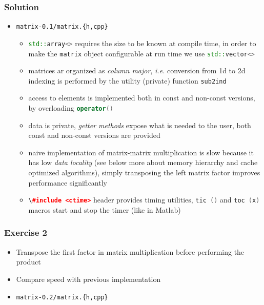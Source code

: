 \documentclass[smaller,a4paper,allowframebreaks]{beamer}
\begin{document}
\begin{frame}[allowframebreaks]\frametitle{Solution}
\begin{itemize}
\item {\tt matrix-0.1/matrix.\{h,cpp\}}\\[3mm]
\begin{itemize}
\item \lstinline[language=C++]{std::array<>}
      requires the size to be known at compile time,
      in order to make the \lstinline[language=C++]{matrix}
      object configurable at run time we use 
      \lstinline[language=C++]{std::vector<>}\\[3mm]
\item matrices ar organized as \emph{column major}, {\it i.e.}
      conversion from 1d to 2d indexing is performed by the utility
      (private) function \lstinline[language=C++]{sub2ind}\\[3mm]
\item access to elements is implemented both in const and non-const
      versions, by overloading \lstinline[language=C++]{operator()} \\[3mm]
\item data is private, \emph{getter methods} expose what is needed to 
      the user, both const and non-const versions are provided \\[3mm]
\item naive implementation of matrix-matrix multiplication is slow 
      because it has low \emph{data locality}
      (see below more about memory hierarchy and cache optimized algorithms), 
      simply transposing the left matrix factor improves performance significantly\\[3mm]
\item \lstinline[language=C++]{\#include <ctime>} header provides timing utilities,
      \lstinline[language=C++]{tic ()} and \lstinline[language=C++]{toc (x)} macros
      start and stop the timer (like in Matlab)
\end{itemize}

\end{itemize}
\end{frame}

\begin{frame}
\frametitle{Exercise 2}

\begin{itemize}
\item Transpose the first factor in matrix multiplication before performing the product
\item Compare speed with previous implementation
\item {\tt matrix-0.2/matrix.\{h,cpp\}}
\end{itemize}
\end{frame}
\end{document}
